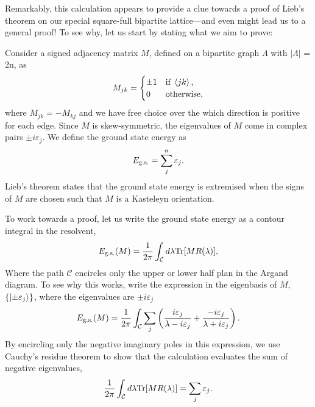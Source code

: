 \documentclass[11pt, oneside]{article} %
\numberwithin{equation}{section}
\begin{document}
Remarkably, this calculation appears to provide a clue towards a proof of Lieb's theorem on our special square-full bipartite lattice---and even might lead us to a general proof! To see why, let us start by stating what we aim to prove:
\begin{theorem}
    Consider a signed adjacency matrix $M$, defined on a bipartite graph $\Lambda$ with $|\Lambda|$ = 2n, as 
    \begin{align}
        M_{jk} = \begin{cases}
            \pm 1 & \text{if}\; \braket{jk}, \\
            0 & \text{otherwise},
        \end{cases}
    \end{align}
    where $M_{jk} = - M_{kj}$ and we have free choice over the which direction is positive for each edge. Since $M$ is skew-symmetric, the eigenvalues of $M$ come in complex pairs $\pm  i \varepsilon_{j}$. We define the ground state energy as 
    \begin{align}
        E_\textup{g.s.} = \sum_{j}^n \varepsilon_j.
    \end{align}
    Lieb's theorem states that the ground state energy is extremised when the signs of $M$ are chosen such that $M$ is a Kasteleyn orientation. 
\end{theorem}

To work towards a proof, let us write the ground state energy as a contour integral in the resolvent,
\begin{align}
    E_\textup{g.s.}(M) =\frac{1}{2\pi}\int_{\mathcal C}d\lambda \textup{Tr} [M R(\lambda)],
\end{align}
Where the path $\mathcal C$ encircles only the upper or lower half plan in the Argand diagram. To see why this works, write the expression in the eigenbasis of $M$, $\{\ket {\pm \varepsilon_j}\}$, where the eigenvalues are $\pm i\varepsilon_j$
\begin{align}
    E_\textup{g.s.}(M) =\frac{1}{2\pi}\int_{\mathcal C}\sum_{j} \left ( 
        \frac{i \varepsilon_j}{\lambda - i \varepsilon_j}
         + 
        \frac{-i \varepsilon_j}{\lambda + i \varepsilon_j}
        \right ).
\end{align}
By encircling only the negative imaginary poles in this expression, we use Cauchy's residue theorem to show that the calculation evaluates the sum of negative eigenvalues,
\begin{align}
    \frac{1}{2\pi}\int_{\mathcal C}d\lambda \textup{Tr} [M R(\lambda)] = \sum_{j} \varepsilon_j.
\end{align}
\end{document}
